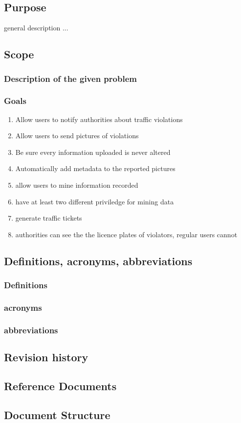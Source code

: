 

\subsection{Purpose}
general description ...

\subsection{Scope}

\subsubsection{Description of the given problem}


\subsubsection{Goals}
\begin{enumerate}[label=E]
  \item Allow users to notify authorities about traffic violations
  \item Allow users to send pictures of violations
  \item Be sure every information uploaded is never altered
  \item Automatically add metadata to the reported pictures
  \item allow users to mine information recorded
  \item have at least two different  priviledge for mining data
  \item generate traffic tickets
  \item authorities can see the the licence plates of violators, regular users cannot

\end{enumerate}



\subsection{Definitions,  acronyms,  abbreviations}
\subsubsection{Definitions}
\subsubsection{acronyms}
\subsubsection{abbreviations}


\subsection{Revision history}


\subsection{Reference Documents}



\subsection{Document Structure}
